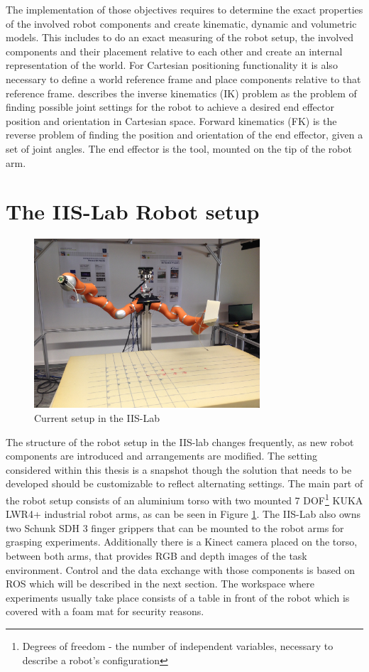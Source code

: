 The implementation of those objectives requires to determine the exact properties of the involved robot components and create kinematic, dynamic and volumetric models. This includes to do an exact measuring of the robot setup, the involved components and their placement relative to each other and create an internal representation of the world. For Cartesian positioning functionality it is also necessary to define a world reference frame and place components relative to that reference frame. \citep{craig2005} describes the inverse kinematics (IK) problem as the problem of finding possible joint settings for the robot to achieve a desired end effector position and orientation in Cartesian space. Forward kinematics (FK) is the reverse problem of finding the position and orientation of the end effector, given a set of joint angles. The end effector is the tool, mounted on the tip of the robot arm.

\section{The IIS-Lab Robot setup}
\begin{figure}[ht]
	\centering
  \includegraphics[width=0.75\textwidth]{images/robot_setup.jpg}
	\caption{Current setup in the IIS-Lab}
	\label{fig:iis_setup}
\end{figure}

The structure of the robot setup in the IIS-lab changes frequently, as new robot components are introduced and arrangements are modified. The setting considered within this thesis is a snapshot though the solution that needs to be developed should be customizable to reflect alternating settings. The main part of the robot setup consists of an aluminium torso with two mounted 7 DOF\footnote{Degrees of freedom - the number of independent variables, necessary to describe a robot's configuration} KUKA LWR4+ industrial robot arms, as can be seen in Figure \ref{fig:iis_setup}. The IIS-Lab also owns two Schunk SDH 3 finger grippers that can be mounted to the robot arms for grasping experiments. Additionally there is a Kinect camera placed on the torso, between both arms, that provides RGB and depth images of the task environment. Control and the data exchange with those components is based on ROS which will be described in the next section. The workspace where experiments usually take place consists of a table in front of the robot which is covered with a foam mat for security reasons. 

